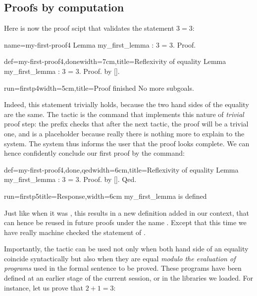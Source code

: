 \subsection{Proofs by computation}\label{ssec:proofcomp}

Here is now the proof scipt that validates the statement $3 = 3$:

\begin{coqdef}{name=my-first-proof4}
Lemma my_first_lemma : 3 = 3.
Proof.
\end{coqdef}
\begin{coq}{def=my-first-proof4,done}{width=7cm,title=Reflexivity of equality}
Lemma my_first_lemma : 3 = 3.
Proof. by [].
\end{coq}
\begin{coqout}{run=firstp4}{width=5cm,title=Proof finished}
No more subgoals.
$~$
\end{coqout}

Indeed, this statement trivially holds, because the two hand sides of
the equality are the same. The tactic  is the command that
implements this nature of \emph{trivial} proof step: the  prefix
checks that after the next tactic, the proof will be a trivial
one, and \C{[]} is a placeholder because really there is nothing more
to explain to the system. The system thus informs the user
that the proof looks complete. We can hence confidently conclude our
first proof by the  command:

\begin{coq}{def=my-first-proof4,done,qed}{width=6cm,title=Reflexivity of equality}
Lemma my_first_lemma : 3 = 3.
Proof. by []. Qed.
\end{coq}
\begin{coqout}{run=firstp5}{title=Response,width=6cm}
my_first_lemma is defined
\end{coqout}

Just like when it was , this results in a new definition
added in our context, that can hence be reused in future proofs under
the name . Except that this time we have really
machine checked the statement of .


Importantly, the  tactic can be used not only when both
hand side of an equality coincide syntactically but also when they are
equal \emph{modulo the evaluation of programs} used in the formal
sentence to be proved. These programs have been defined at an
earlier stage of the current session, or in the libraries
we loaded. For instance, let us prove that $2 + 1 = 3$:

